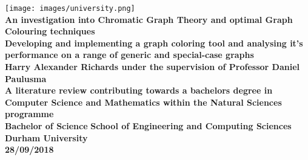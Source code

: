 \documentclass[12pt, a4paper]{article}
\begin{document}
\renewcommand\refname{Bibliography}
\pagestyle{MainStyle}








\begin{titlepage}
\begin{center}
\texttt{[image: images/university.png]}\\

\vspace*{4cm}
{\fontsize{20}{12}\textbf{An investigation into Chromatic Graph Theory and optimal Graph Colouring techniques}}\\
\vspace{1cm}
{\fontsize{12}{10}\textbf{Developing and implementing a graph coloring tool and analysing it's performance on a range of generic and special-case graphs}}\\
\vspace{2cm}        
\textbf{Harry Alexander Richards under the supervision of Professor Daniel Paulusma}\\
\vspace{1cm}     
\textbf{A literature review contributing towards a bachelors degree in\\ Computer Science and Mathematics within the Natural Sciences programme\\
Bachelor of Science}
\vspace{1cm}        
\textbf{School of Engineering and Computing Sciences\\
Durham University\\
28/09/2018}
\end{center}
\end{titlepage}
\end{document}
